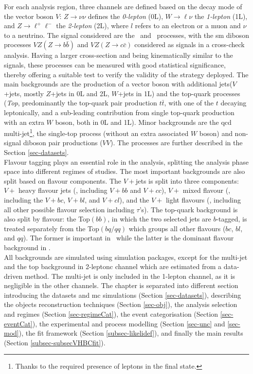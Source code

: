 For each analysis region, three channels are defined based on the decay mode of the vector boson $V$: $Z \rightarrow \nu \nu$ defines the \textit{0-lepton} (0L), $W \rightarrow \ell \nu $ the \textit{1-lepton} (1L), and $Z \rightarrow\ell^+\ell^-$ the \textit{2-lepton} (2L), where $l$ refers to an electron or a muon and $\nu$ to a neutrino. The signal considered are the  \vhb\ and \vhc\ processes, with the \gls{sm} diboson processes $VZ (Z\rightarrow b\bar{b})$ and $VZ (Z\rightarrow c\bar{c})$ considered as signals in a cross-check analysis. Having a larger cross-section and being kinematically similar to the signals, these processes can be measured with good statistical significance, thereby offering a suitable test to verify the validity of the strategy deployed. The main backgrounds are the production of a vector boson with additional jets($V$+jets, mostly $Z$+jets in 0L and 2L, $W$+jets in 1L) and the top-quark processes (\textit{Top}, predominantly the top-quark pair production $t\bar{t}$, with one of the $t$ decaying leptonically, and a sub-leading contribution from single top-quark production with an extra $W$ boson, both in 0L and 1L). Minor backgrounds are the \gls{qcd} multi-jet\footnote{Thanks to the required presence of leptons in the final state.}, the single-top process (without an extra associated $W$ boson) and non-signal diboson pair productions ($VV$). The processes are further described in the Section \ref{sec-datasets}. \\ 

Flavour tagging plays an essential role in the analysis, splitting the analysis phase space into different regimes of studies. The most important backgrounds are also split based on flavour components. The $V+$jets is split into three components: $V+$ heavy flavour jets (\vhf, including $V+bb$ and $V+cc$), $V+$ mixed flavour (\vmf, including the $V+bc$, $V+bl$, and $V+cl$), and the $V+$ light flavours (\vlf, including all other possible flavour selection including $\tau$'s). The top-quark background is also split by flavour: the Top$(bb)$, in which the two selected jets are $b$-tagged, is treated separately from the Top$(bq/qq)$ which groups all other flavours ($bc$, $bl$, and $qq$). The former is important in \vhb\ while the latter is the dominant flavour background in \vhc. \\

All backgrounds are simulated using  simulation packages, except for the multi-jet and the top background in 2-leptonc channel which are estimated from a data-driven method. The multi-jet is only included in the 1-lepton channel, as it is negligible in the other channels. The chapter is separated into different section introducing the datasets and \gls{mc} simulations (Section \ref{sec-datasets}), describing the objects reconstruction techniques (Section \ref{sec-obj}), the analysis selection and regimes (Section \ref{sec-regimeCat}), the event categorisation (Section \ref{sec-eventCat}), the experimental and process modelling (Section \ref{sec-unc} and \ref{sec-mod}), the fit framework (Section \ref{subsec-likelidef}), and finally the main results (Section \ref{subsec-subsecVHBCfit}).

